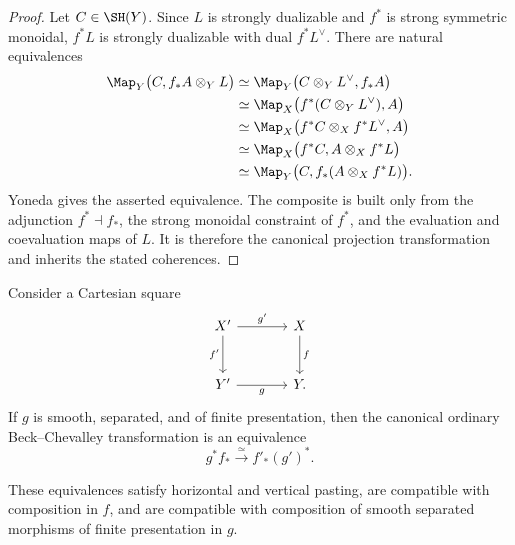 \begin{proof}
Let \(C\in\SH(Y)\).  Since \(L\) is strongly dualizable and \(f^*\) is
strong symmetric monoidal, \(f^*L\) is strongly dualizable with dual
\(f^*L^\vee\).  There are natural equivalences
\[
\begin{aligned}
    \Map_Y
    \bigl(
      C,
      f_*A\otimes_YL
    \bigr)
    &\simeq
    \Map_Y
    \bigl(
      C\otimes_YL^\vee,
      f_*A
    \bigr) \\
    &\simeq
    \Map_X
    \bigl(
      f^*(C\otimes_YL^\vee),
      A
    \bigr) \\
    &\simeq
    \Map_X
    \bigl(
      f^*C\otimes_Xf^*L^\vee,
      A
    \bigr) \\
    &\simeq
    \Map_X
    \bigl(
      f^*C,
      A\otimes_Xf^*L
    \bigr) \\
    &\simeq
    \Map_Y
    \bigl(
      C,
      f_*(A\otimes_Xf^*L)
    \bigr).
\end{aligned}
\]
Yoneda gives the asserted equivalence.  The composite is built only from
the adjunction \(f^*\dashv f_*\), the strong monoidal constraint of
\(f^*\), and the evaluation and coevaluation maps of \(L\).  It is therefore
the canonical projection transformation and inherits the stated
coherences.
\end{proof}

\begin{theorem}
\label{thm:smooth-base-change-arbitrary-direct-image}
Consider a Cartesian square
\[
\begin{tikzcd}[column sep=large,row sep=large]
    X' \arrow[r,"g'"] \arrow[d,"f'"']
        & X \arrow[d,"f"] \\
    Y' \arrow[r,"g"']
        & Y.
\end{tikzcd}
\]
If \(g\) is smooth, separated, and of finite presentation, then the
canonical ordinary Beck--Chevalley transformation is an equivalence
\[
    g^*f_*
    \xrightarrow{\simeq}
    f'_*(g')^*.
\]

These equivalences satisfy horizontal and vertical pasting, are compatible
with composition in \(f\), and are compatible with composition of smooth
separated morphisms of finite presentation in \(g\).
\end{theorem}

